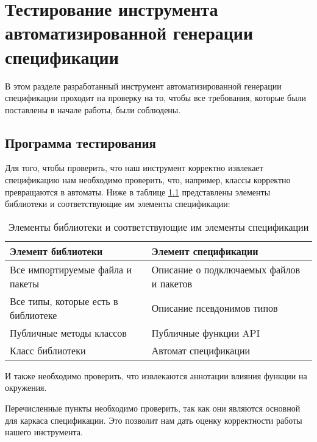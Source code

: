 \chapter{Тестирование инструмента автоматизированной генерации спецификации}

В этом разделе разработанный инструмент автоматизированной генерации спецификации проходит на проверку на то, чтобы все требования, которые были поставлены в начале работы, были соблюдены.

\section{Программа тестирования}

Для того, чтобы проверить, что наш инструмент корректно извлекает спецификацию нам необходимо проверить, что, например, классы корректно превращаются в автоматы.
Ниже в таблице \ref{tabular:second_tab} представлены элементы библиотеки и соответствующие им элементы спецификации:
\begin{table}[H]
	\caption{Элементы библиотеки и соответствующие им элементы спецификации}
	\begin{center}
		\begin{tabular}{|l|l|}
			\hline
			Элемент библиотеки & Элемент спецификации\\ \hline

			Все импортируемые файла и пакеты & Описание о подключаемых файлов и пакетов\\ \hline
			Все типы, которые есть в библиотеке & Описание псевдонимов типов\\ \hline
			Публичные методы классов & Публичные функции API\\ \hline
			Класс библиотеки & Автомат спецификации\\ \hline
		\end{tabular}
		\label{tabular:second_tab}
	\end{center}
\end{table}

И также необходимо проверить, что извлекаются аннотации влияния функции на окружения.

Перечисленные пункты необходимо проверить, так как они являются основной для каркаса спецификации.
Это позволит нам дать оценку корректности работы нашего инструмента.


